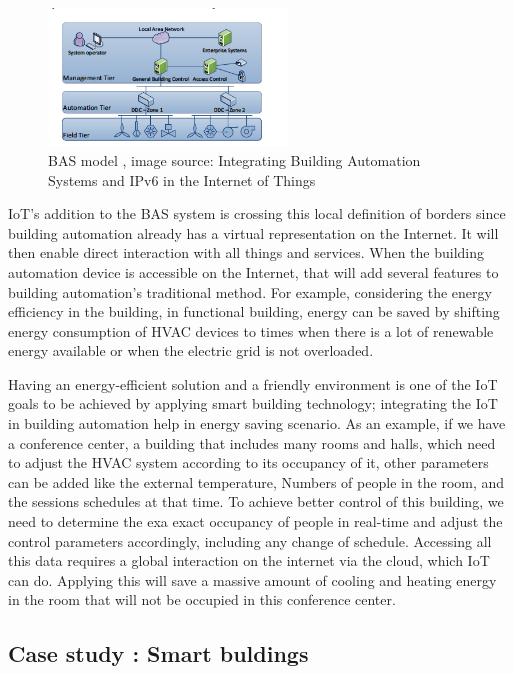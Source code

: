 \documentclass[conference]{IEEEtran}
\begin{document}
\begin{figure}[h!]
	\centering
	\includegraphics[width=2.5in]{newIOt.png}
	\caption{\label{neu}  BAS  model
		, image source: Integrating Building Automation Systems and IPv6
in the Internet of Things
		\cite{NewIOT} }
\end{figure}



IoT's addition to the BAS system is crossing this local definition of borders since building automation already has a virtual representation on the Internet. It will then enable direct interaction with all things and services. When the building automation device is accessible on the Internet, that will add several features to building automation's traditional method. For example, considering the energy efficiency in the building, in functional building\cite{NewIOT}, energy can be saved by shifting energy consumption of HVAC devices to times when there is a lot of renewable energy available or when the electric grid is not overloaded. 


Having an energy-efficient solution and a friendly environment is one of the IoT goals to be achieved by applying smart building technology; integrating the IoT in building automation help in energy saving scenario. As an example\cite{NewIOT}, if we have a conference center, a building that includes many rooms and halls, which need to adjust the HVAC system according to its occupancy of it, other parameters can be added like the external temperature, Numbers of people in the room, and the sessions schedules at that time. To achieve better control of this building, we need to determine the exa exact occupancy of people in real-time and adjust the control parameters accordingly, including any change of schedule. Accessing all this data requires a global interaction on the internet via the cloud, which IoT can do. Applying this will save a massive amount of cooling and heating energy in the room that will not be occupied in this conference center. 


\subsection{Case study : Smart buldings}
\end{document}
